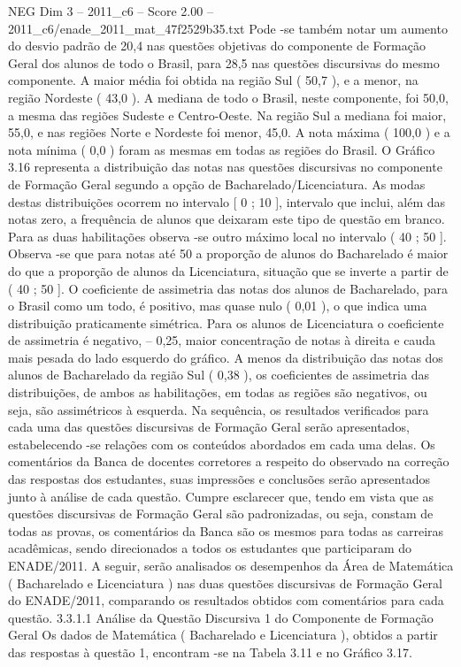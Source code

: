 \begin{textsample}{NEG Dim 3 – 2011\_c6 – Score 2.00 – 2011\_c6/enade\_2011\_mat\_47f2529b35.txt}
Pode -se também notar um aumento do desvio padrão de 20,4 nas questões objetivas do componente de Formação Geral dos alunos de todo o Brasil, para 28,5 nas questões discursivas do mesmo componente.
A maior média foi obtida na região Sul ( 50,7 ), e a menor, na região Nordeste ( 43,0 ).
A mediana de todo o Brasil, neste componente, foi 50,0, a mesma das regiões Sudeste e Centro-Oeste.
Na região Sul a mediana foi maior, 55,0, e nas regiões Norte e Nordeste foi menor, 45,0.
A nota máxima ( 100,0 ) e a nota mínima ( 0,0 ) foram as mesmas em todas as regiões do Brasil.
O Gráfico 3.16 representa a distribuição das notas nas questões discursivas no componente de Formação Geral segundo a opção de Bacharelado/Licenciatura.
As modas destas distribuições ocorrem no intervalo [ 0 ; 10 ], intervalo que inclui, além das notas zero, a frequência de alunos que deixaram este tipo de questão em branco.
Para as duas habilitações observa -se outro máximo local no intervalo ( 40 ; 50 ].
Observa -se que para notas até 50 a proporção de alunos do Bacharelado é maior do que a proporção de alunos da Licenciatura, situação que se inverte a partir de ( 40 ; 50 ].
O coeficiente de assimetria das notas dos alunos de Bacharelado, para o Brasil como um todo, é positivo, mas quase nulo ( 0,01 ), o que indica uma distribuição praticamente simétrica.
Para os alunos de Licenciatura o coeficiente de assimetria é negativo, – 0,25, maior concentração de notas à direita e cauda mais pesada do lado esquerdo do gráfico.
A menos da distribuição das notas dos alunos de Bacharelado da região Sul ( 0,38 ), os coeficientes de assimetria das distribuições, de ambos as habilitações, em todas as regiões são negativos, ou seja, são assimétricos à esquerda.
Na sequência, os resultados verificados para cada uma das questões discursivas de Formação Geral serão apresentados, estabelecendo -se relações com os conteúdos abordados em cada uma delas.
Os comentários da Banca de docentes corretores a respeito do observado na correção das respostas dos estudantes, suas impressões e conclusões serão apresentados junto à análise de cada questão.
Cumpre esclarecer que, tendo em vista que as questões discursivas de Formação Geral são padronizadas, ou seja, constam de todas as provas, os comentários da Banca são os mesmos para todas as carreiras acadêmicas, sendo direcionados a todos os estudantes que participaram do ENADE/2011.
A seguir, serão analisados os desempenhos da Área de Matemática ( Bacharelado e Licenciatura ) nas duas questões discursivas de Formação Geral do ENADE/2011, comparando os resultados obtidos com comentários para cada questão. 3.3.1.1 Análise da Questão Discursiva 1 do Componente de Formação Geral Os dados de Matemática ( Bacharelado e Licenciatura ), obtidos a partir das respostas à questão 1, encontram -se na Tabela 3.11 e no Gráfico 3.17.

\end{textsample}
